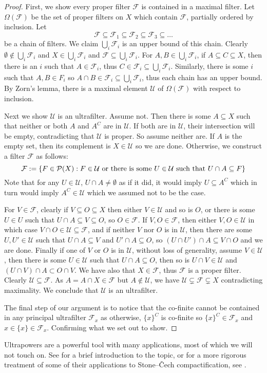 \documentclass[draft]{amsart}
\newcommand{\U}{\mathcal{U}}
\newcommand{\F}{\mathcal{F}}
\newcommand{\Po}{\mathcal{P}}
\begin{document}
    \begin{proof} 
    First, we show every proper filter \(\F\) is contained in a maximal filter. Let \(\Omega(\F)\) be the set of proper filters on \(X\) which contain \(\F\), partially ordered by inclusion.  
    Let \[\F\subseteq \F_1\subseteq \F_2 \subseteq \F_3 \subseteq \dots\]
    be a chain of filters. We claim \(\bigcup_i \F_i\) is an upper bound of this chain. Clearly \(\emptyset \notin \bigcup_i \F_i\) and \(X\in \bigcup_i \F_i\) and \(\F\subseteq \bigcup_i \F_i\). For \(A,B\in \bigcup_i \F_i\), if \(A\subseteq C \subseteq X\), then there is an \(i\) such that  \(A\in \F_i\), thus \(C\in \F_i\subseteq \bigcup_i \F_i\). Similarly, there is some \(i\) such that \(A,B\in F_i\) so \(A\cap B\in \F_i \subseteq \bigcup_i \F_i\), thus each chain has an upper bound. By Zorn's lemma, there is a maximal element \(\U\) of \(\Omega(\F)\) with respect to inclusion.

    Next we show \(\U\) is an ultrafilter. 
    Assume not. Then there is some \(A\subseteq X\) such that neither or both \(A\) and \(A^C\) are in \(\U\). If both are in \(\U\), their intersection will be empty, contradicting that \(\U\) is proper. So assume neither are. If \(A\) is the empty set, then its complement is \(X\in \U\) so we are done. Otherwise, we construct a filter \(\F\) as follows:
    \[\F:=\set{F\in \Po(X)}{F\in \U \text{ or there is some  } U \in \U \text{ such that }U\cap A \subseteq F  } \]
    Note that for any \(U \in \U\), \(U\cap A\ne \emptyset\) as if it did, it would imply \(U\subseteq A^C\) which in turn would imply \(A^C\in \U\) which we assumed not to be the case.
    
    For \(V\in \F\), clearly if \(V \subseteq O \subseteq X\) then either \(V\in \U\) and so is \(O\), or there is some \(U\in U\) such that \(U\cap A\subseteq V \subseteq O\), so \(O\in \F\). If \(V,O\in \F\), then either \(V,O\in \U\) in which case \(V\cap O\in \U\subseteq \F\), and if neither \(V\) nor \(O\) is in \(\U\), then there are some \(U,U'\in \U\) such that \(U\cap A\subseteq V\) and \(U'\cap A \subseteq O\), so \((U\cap U')\cap A\subseteq V\cap O\) and we are done. Finally if one of \(V\) or \(O\) is in \(\U\), without loss of generality, assume \(V\in \U\), then there is some \(U\in \U\) such that \(U\cap A\subseteq O\), then so is \(U\cap V\in \U\) and \((U\cap V)\cap A\subset O\cap V\). We have also that \(X\in \F\), thus \(\F\) is a proper filter. Clearly \(\U\subseteq \F\). As \(A=A\cap X\in \F\) but \(A\notin \U\), we have \(\U\subsetneq \F \subsetneq X\) contradicting maximality. We conclude that \(\U\) is an ultrafilter. 

    The final step of our argument is to notice that the co-finite cannot be contained in any principal ultrafilter \(\F_x\) as otherwise, \(\{x\}^C\) is co-finite so \(\{x\}^C\in \F_x\) and \(x\in \{x\}\in \F_x\).  Confirming what we set out to show.
\end{proof}
    Ultrapowers are a powerful tool with many applications, most of which we will not touch on. See \cite{kruckmannotes} for a brief introduction to the topic, or for a more rigorous treatment of some of their applications to Stone–Čech compactification, see \cite{Johnstone_1982}.
\end{document}
